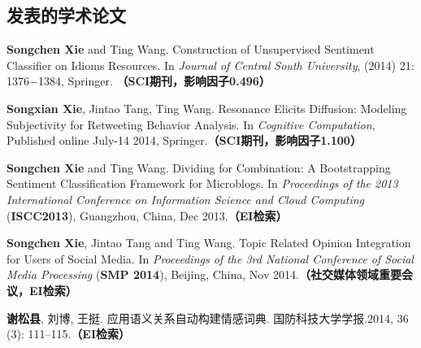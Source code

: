 \begin{resume}

  \section*{发表的学术论文} %

  \begin{enumerate}[{[}1{]}]
  \addtolength{\itemsep}{-.36\baselineskip}%
  
  \item \textbf{Songchen Xie} and Ting Wang. Construction of Unsupervised Sentiment Classifier on Idioms Resources. In {\it Journal of Central South University}, (2014) 21: 1376−1384, Springer. \textbf{（SCI期刊，影响因子0.496）}
 
 \item \textbf{Songxian Xie}, Jintao Tang, Ting Wang. Resonance Elicits Diffusion: Modeling Subjectivity for Retweeting Behavior Analysis. In {\it Cognitive Computation}, Published online July-14 2014, Springer.\textbf{（SCI期刊，影响因子1.100）}

 \item \textbf{Songchen Xie} and Ting Wang. Dividing for Combination: A Bootstrapping Sentiment Classification Framework for Microblogs. In {\it Proceedings of the 2013 International Conference on Information Science and Cloud Computing} (\textbf{ISCC2013}), Guangzhou, China, Dec 2013.\textbf{（EI检索）}
 
 \item  \textbf{Songchen Xie}, Jintao Tang and Ting Wang. Topic Related Opinion Integration for Users of Social Media. In {\it Proceedings of the 3rd National Conference of Social Media Processing} (\textbf{SMP 2014}), Beijing, China, Nov 2014.\textbf{（社交媒体领域重要会议，EI检索）}

\item \textbf{谢松县}, 刘博, 王挺. 应用语义关系自动构建情感词典. 国防科技大学学报.2014, 36 (3): 111–115.\textbf{（EI检索）}

  \end{enumerate}

\end{resume}
